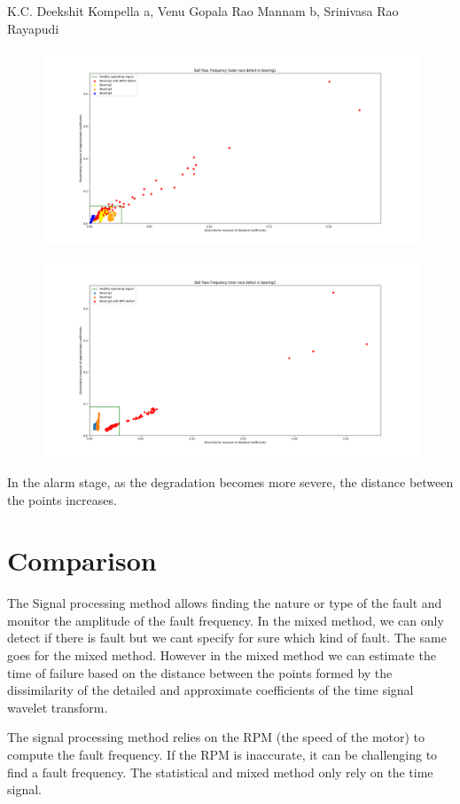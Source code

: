 \documentclass[11pt, oneside]{article}   	%
\begin{document}
K.C. Deekshit Kompella a, Venu Gopala Rao Mannam b, Srinivasa Rao Rayapudi
\begin{figure}[H] %
   \centering
   \includegraphics[width=6in]{mixed_method_bpfo.png} 
   \caption{}
   \label{fig:example}
\end{figure}
\begin{figure}[H] %
   \centering
   \includegraphics[width=6in]{mixed_method_bpfi.png} 
   \caption{}
   \label{fig:example}
\end{figure}
In the alarm stage, as the degradation becomes more severe, the distance between the points increases.
\section{Comparison}
The Signal processing method allows finding the nature or type of the fault and monitor the amplitude of the fault frequency. In the mixed method, we can only detect if there is fault but we cant specify for sure which kind of fault. The same goes for the mixed method. However in the mixed method we can estimate the time of failure based on the distance between the points formed by the dissimilarity of the detailed and approximate coefficients of the time signal wavelet transform.
\begin{flushleft}
The signal processing method relies on the RPM (the speed of the motor) to compute the fault frequency. If the RPM is inaccurate, it can be challenging to find a fault frequency. The statistical and mixed method only rely on the time signal.
\end{flushleft}
\end{document}
